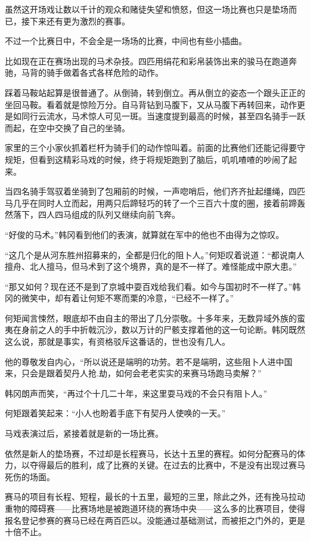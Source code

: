 虽然这开场戏让数以千计的观众和赌徒失望和愤怒，但这一场比赛也只是垫场而已，接下来还有更为激烈的赛事。

不过一个比赛日中，不会全是一场场的比赛，中间也有些小插曲。

比如现在正在赛场出现的马术杂技。四匹用绢花和彩帛装饰出来的骏马在跑道奔驰，马背的骑手做着各式各样危险的动作。

踩着马鞍站起算是很普通了。从倒骑，转到倒立。再从倒立的姿态一个跟头正正的坐回马鞍。看着就是惊险万分。自马背钻到马腹下，又从马腹下再转回来，动作更是如同行云流水，马术惊人可见一斑。当速度提到最高的时候，甚至四名骑手一跃而起，在空中交换了自己的坐骑。

家里的三个小家伙抓着栏杆为骑手们的动作惊叫着。前面的比赛他们还能记得要守规矩，但看到这精彩马戏的时候，终于将规矩跑到了脑后，叽叽喳喳的吵闹了起来。

当四名骑手驾驭着坐骑到了包厢前的时候，一声唿哨后，他们齐齐扯起缰绳，四匹马几乎在同时人立而起，用两只后蹄轻巧的转了一个三百六十度的圈，接着前蹄轰然落下，四人四马组成的队列又继续向前飞奔。

“好俊的马术。”韩冈看到他们的表演，就算就在军中的他也不由得为之惊叹。

“这几个是从河东胜州招募来的，全都是归化的阻卜人。”何矩叹着说道：“都说南人擅舟、北人擅马，但马术到了这个境界，真的是不一样了。难怪能成中原大患。”

“那又如何？现在还不是到了京城中耍百戏给我们看。如今与国初时不一样了。”韩冈的微笑中，却有着让何矩不寒而栗的冷意，“已经不一样了。”

何矩闻言悚然，眼底却不由自主的带出了几分崇敬。十多年来，无数异域外族的蛮夷在身前之人的手中折戟沉沙，数以万计的尸骸支撑着他的这一句论断。韩冈既然这么说，那就是事实，有资格驳斥这番话的，世也没有几人。

他的尊敬发自内心，“所以说还是端明的功劳。若不是端明，这些阻卜人进中国来，只会是跟着契丹人抢.劫，如何会老老实实的来赛马场跑马卖解？”

韩冈朗声而笑，“再过个十几二十年，来这里耍马戏的不会只有阻卜人。”

何矩跟着笑起来：“小人也盼着手底下有契丹人使唤的一天。”

马戏表演过后，紧接着就是新的一场比赛。

依然是新人的垫场赛，不过却是长程赛马，长达十五里的赛程。如何分配赛马的体力，以夺得最后的胜利，成了比赛的关键。在过去的比赛中，不是没有出现过赛马死伤的场面。

赛马的项目有长程、短程，最长的十五里，最短的三里，除此之外，还有挽马拉动重物的障碍赛——比赛场地是被跑道环绕的赛场中央——这么多的比赛项目，使得报名登记参赛的赛马已经在两百匹以。没能通过基础测试，而被拒之门外的，更是十倍不止。

